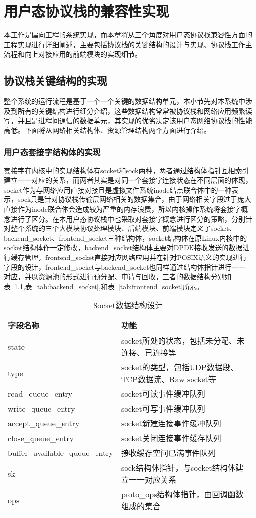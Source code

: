 \chapter{用户态协议栈的兼容性实现}
本工作是偏向工程的系统实现，而本章将从三个角度对用户态协议栈兼容性方面的工程实现进行详细阐述，主要包括协议栈的关键结构的设计与实现、协议栈工作主流程和向上对接应用的前端模块的实现细节。

\section{协议栈关键结构的实现}
整个系统的运行流程是基于一个一个关键的数据结构单元，本小节先对本系统中涉及到所有的关键结构进行细分介绍，这些数据结构常常被协议栈和网络应用频繁读写，并且是进程间通信的数据单元，其实现的优劣决定该用户态网络协议栈的性能高低。下面将从网络相关结构体、资源管理结构两个方面进行介绍。
\subsection{用户态套接字结构体的实现}
套接字在内核中的实现结构体有socket和sock两种，两者通过结构体指针互相索引建立一一对应的关系，而两者其实是对同一个套接字连接状态在不同层面的体现，socket作为与网络应用直接对接且是虚拟文件系统inode结点联合体中的一种表示，sock只是针对协议栈传输层网络相关的数据集合，由于网络相关字段过于庞大直接作为inode联合体会造成较为严重的内存浪费，所以内核操作系统将套接字概念进行了区分。在本用户态协议栈中也采取对套接字概念进行区分的策略，分别针对整个系统的三个大模块协议处理模块、后端模块、前端模块定义了socket、backend\_socket、frontend\_socket三种结构体，socket结构体在原Linux内核中的socket结构体作一定修改，backend\_socket结构体主要对DPDK接收发送的数据进行缓存管理，frontend\_socket直接对应网络应用并在针对POSIX语义的实现进行字段的设计，frontend\_socket与backend\_socket也同样通过结构体指针进行一一对应，并以资源池的形式进行预分配、申请与回收，三者的数据结构分别如表~\ref{tab:socket},表~\ref{tab:backend_socket},和表~\ref{tab:frontend_socket}所示。

\begin{table}[]
\centering
\caption{Socket数据结构设计}
\label{tab:socket}
\begin{tabular}{ll}
\toprule[1.5pt]
\textbf{字段名称} & \textbf{功能} \\ 
\midrule[1pt]
state & socket所处的状态，包括未分配、未连接、已连接等 \\ 
type & socket的类型，包括UDP数据段、TCP数据流、Raw socket等\\ 
read\_queue\_entry & socket可读事件缓冲队列 \\ 
write\_queue\_entry & socket可写事件缓冲队列 \\ 
accept\_queue\_entry & socket新建连接事件缓冲队列 \\ 
close\_queue\_entry & socket关闭连接事件缓存队列 \\
buffer\_available\_queue\_entry & 接收缓存空间已满事件队列 \\ 
sk & sock结构体指针，与socket结构体建立一一对应关系 \\
ops & proto\_ops结构体指针，由回调函数组成的集合 \\
\bottomrule[1.5pt]
\end{tabular}
\end{table}

